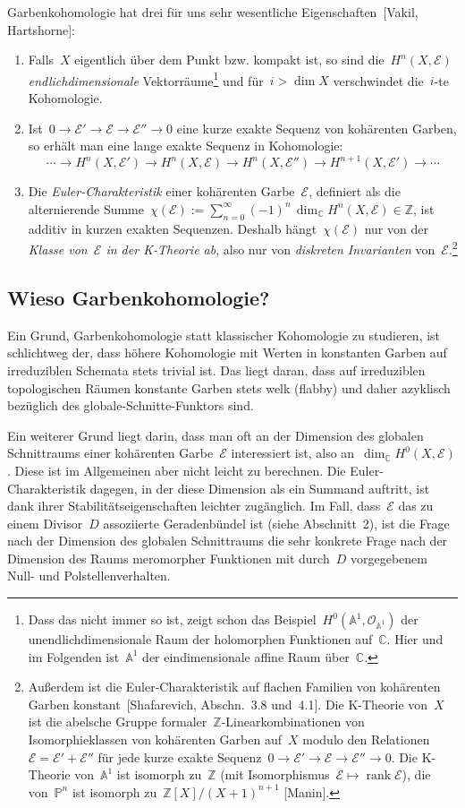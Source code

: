 \documentclass[a4paper,ngerman,12pt]{scrartcl}
\theoremstyle{definition}
\theoremstyle{plain}
\theoremstyle{remark}
\renewcommand{\AA}{\mathbb{A}}
\newcommand{\CC}{\mathbb{C}}
\newcommand{\ZZ}{\mathbb{Z}}
\newcommand{\PP}{\mathbb{P}}
\newcommand{\E}{\mathcal{E}}
\renewcommand{\O}{\mathcal{O}}
\newcommand{\rank}{\operatorname{rank}}
\newcommand{\lra}{\longrightarrow}
\begin{document}
Garbenkohomologie hat drei für uns sehr wesentliche Eigenschaften~[Vakil,
Hartshorne]:
\begin{enumerate}
\item Falls~$X$ eigentlich über dem Punkt bzw. kompakt ist, so sind
die~$H^n(X,\E)$ \emph{endlichdimensionale} Vektorräume\footnote{Dass das
nicht immer so ist, zeigt schon das Beispiel~$H^0(\AA^1, \O_{\AA^1})$ der
unendlichdimensionale Raum der holomorphen Funktionen auf~$\CC$. Hier und im
Folgenden ist~$\AA^1$ der eindimensionale affine Raum über~$\CC$.} und für~$i > \dim X$
verschwindet die~$i$-te Kohomologie.
\item Ist~$0 \to \E' \to \E \to \E'' \to 0$ eine kurze exakte Sequenz von
kohärenten Garben, so erhält man eine lange exakte Sequenz in Kohomologie:
\[ \cdots \lra H^n(X,\E') \lra H^n(X,\E) \lra H^n(X,\E'') \lra H^{n+1}(X,\E')
\lra \cdots \]
\item Die \emph{Euler-Charakteristik} einer kohärenten Garbe~$\E$, definiert
als die alternierende Summe~$\chi(\E) := \sum_{n=0}^\infty (-1)^n\, \dim_\CC H^n(X,\E)
\in \ZZ$, ist additiv in kurzen exakten Sequenzen. Deshalb hängt~$\chi(\E)$ nur
von der \emph{Klasse von~$\E$ in der K-Theorie ab}, also nur von
\emph{diskreten Invarianten} von~$\E$.\footnote{Außerdem ist die
Euler-Charakteristik auf flachen Familien von kohärenten Garben
konstant~[Shafarevich, Abschn.~3.8 und~4.1].
Die K-Theorie von~$X$ ist die abelsche Gruppe
formaler~$\ZZ$-Linearkombinationen von Isomorphieklassen von kohärenten Garben
auf~$X$ modulo den Relationen~$\E = \E' + \E''$ für jede kurze exakte
Sequenz~$0 \to \E' \to \E \to \E'' \to 0$.  Die K-Theorie von~$\AA^1$ ist
isomorph zu~$\ZZ$ (mit Isomorphismus~$\E \mapsto \rank\E$), die von~$\PP^n$ ist
isomorph zu~$\ZZ[X]/(X+1)^{n+1}$ [Manin].}
\end{enumerate}


\subsection*{Wieso Garbenkohomologie?}

Ein Grund, Garbenkohomologie statt klassischer Kohomologie zu studieren, ist
schlichtweg der, dass höhere Kohomologie mit Werten in konstanten Garben auf
irreduziblen Schemata stets trivial ist. Das liegt daran, dass auf irreduziblen
topologischen Räumen konstante Garben stets welk (flabby) und daher azyklisch
bezüglich des globale-Schnitte-Funktors sind.

Ein weiterer Grund liegt darin, dass man oft an der Dimension des globalen
Schnitt\-raums einer kohärenten Garbe~$\E$ interessiert ist, also an~$\dim_\CC
H^0(X,\E)$. Diese ist im Allgemeinen aber nicht leicht zu berechnen. Die
Euler-Charakteristik dagegen, in der diese Dimension als ein Summand auftritt,
ist dank ihrer Stabilitätseigenschaften leichter zugänglich. Im Fall, dass~$\E$
das zu einem Divisor~$D$ assoziierte Geradenbündel ist (siehe Abschnitt~2), ist
die Frage nach der Dimension des globalen Schnittraums die sehr konkrete Frage
nach der Dimension des Raums meromorpher Funktionen mit durch~$D$ vorgegebenem
Null- und Polstellenverhalten.
\end{document}
